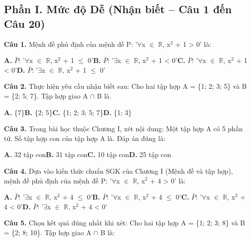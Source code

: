 \documentclass[11pt,a4paper]{article}
\begin{document}
\subsection*{\color{accent} Phần I. Mức độ Dễ (Nhận biết -- Câu 1 đến Câu 20)}
\textbf{\color{primary} Câu 1.} Mệnh đề phủ định của mệnh đề P: '$\forall$x $\in$ $\mathbb{R}$, x$^2$ + 1 > 0' là:\par
\hspace*{1.5em}\textbf{A.} $\bar{P}$: '$\forall$x $\in$ $\mathbb{R}$, x$^2$ + 1 $\le$ 0'\quad\quad \textbf{B.} $\bar{P}$: '$\exists$x $\in$ $\mathbb{R}$, x$^2$ + 1 < 0'\quad\quad \textbf{C.} $\bar{P}$: '$\forall$x $\in$ $\mathbb{R}$, x$^2$ + 1 < 0'\quad\quad \textbf{D.} $\bar{P}$: '$\exists$x $\in$ $\mathbb{R}$, x$^2$ + 1 $\le$ 0'\par\vspace{2pt}
\textbf{\color{primary} Câu 2.} Thực hiện yêu cầu nhận biết sau: Cho hai tập hợp A = \{1; 2; 3; 5\} và B = \{2; 5; 7\}. Tập hợp giao A $\cap$ B là.\par
\hspace*{1.5em}\textbf{A.} \{7\}\quad\quad \textbf{B.} \{2; 5\}\quad\quad \textbf{C.} \{1; 2; 3; 5; 7\}\quad\quad \textbf{D.} \{1; 3\}\par\vspace{2pt}
\textbf{\color{primary} Câu 3.} Trong bài học thuộc Chương I, xét nội dung: Một tập hợp A có 5 phần tử. Số tập hợp con của tập hợp A là. Đáp án đúng là:\par
\hspace*{1.5em}\textbf{A.} 32 tập con\quad\quad \textbf{B.} 31 tập con\quad\quad \textbf{C.} 10 tập con\quad\quad \textbf{D.} 25 tập con\par\vspace{2pt}
\textbf{\color{primary} Câu 4.} Dựa vào kiến thức chuẩn SGK của Chương I (Mệnh đề và tập hợp), mệnh đề phủ định của mệnh đề P: '$\forall$x $\in$ $\mathbb{R}$, x$^2$ + 4 > 0' là:\par
\hspace*{1.5em}\textbf{A.} $\bar{P}$: '$\exists$x $\in$ $\mathbb{R}$, x$^2$ + 4 $\le$ 0'\quad\quad \textbf{B.} $\bar{P}$: '$\forall$x $\in$ $\mathbb{R}$, x$^2$ + 4 $\le$ 0'\quad\quad \textbf{C.} $\bar{P}$: '$\forall$x $\in$ $\mathbb{R}$, x$^2$ + 4 < 0'\quad\quad \textbf{D.} $\bar{P}$: '$\exists$x $\in$ $\mathbb{R}$, x$^2$ + 4 < 0'\par\vspace{2pt}
\textbf{\color{primary} Câu 5.} Chọn kết quả đúng nhất khi xét: Cho hai tập hợp A = \{1; 2; 3; 8\} và B = \{2; 8; 10\}. Tập hợp giao A $\cap$ B là:\par
\end{document}
